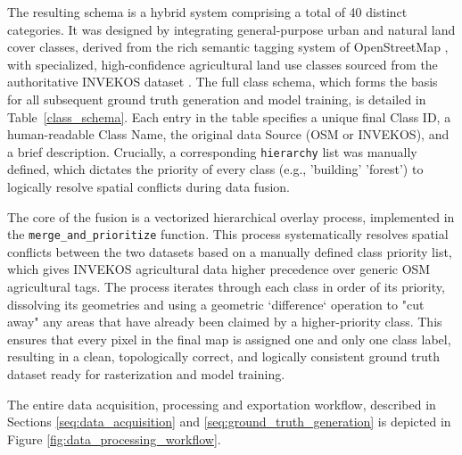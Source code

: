 \documentclass{report}
\begin{document}
The resulting schema is a hybrid system comprising a total of 40 distinct categories. It was designed by integrating general-purpose urban and natural land cover classes, derived from the rich semantic tagging system of OpenStreetMap \parencite{BoeingModelingAnalyzingUrbanNetworksAmenitiesOSMnx2025}, with specialized, high-confidence agricultural land use classes sourced from the authoritative INVEKOS dataset \parencite{AgrarmarktAustriaINVEKOSSchlageOsterreich2024}. The full class schema, which forms the basis for all subsequent ground truth generation and model training, is detailed in Table~\ref{class_schema}. Each entry in the table specifies a unique final Class ID, a human-readable Class Name, the original data Source (OSM or INVEKOS), and a brief description. Crucially, a corresponding \texttt{hierarchy} list was manually defined, which dictates the priority of every class (e.g., 'building' \> 'forest') to logically resolve spatial conflicts during data fusion.\par

The core of the fusion is a vectorized hierarchical overlay process, implemented in the \texttt{merge\_and\_prioritize} function. This process systematically resolves spatial conflicts between the two datasets based on a manually defined class priority list, which gives INVEKOS agricultural data higher precedence over generic OSM agricultural tags. The process iterates through each class in order of its priority, dissolving its geometries and using a geometric `difference` operation to "cut away" any areas that have already been claimed by a higher-priority class. This ensures that every pixel in the final map is assigned one and only one class label, resulting in a clean, topologically correct, and logically consistent ground truth dataset ready for rasterization and model training. \par

The entire data acquisition, processing and exportation workflow, described in Sections \ref{seq:data_acquisition} and \ref{seq:ground_truth_generation} is depicted in Figure \ref{fig:data_processing_workflow}. 
\end{document}
